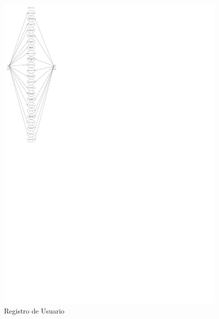 \documentclass[conference]{IEEEtran}
\begin{document}
\begin{figure}[H]
\centering
\includegraphics[scale=0.19]{imagenes/DCU Registro de Usuario2.pdf}
\caption{ Registro de Usuario}
\end{figure}
\end{document}
